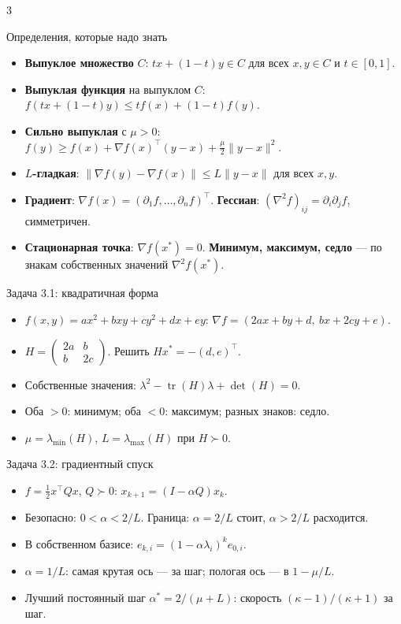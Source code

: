 \documentclass[10pt,a4paper]{article}
\makeatletter
\newcommand{\cssec}[1]{\par\addvspace{3.5pt}\noindent
  \colorbox{hselight}{\parbox{\dimexpr\linewidth-2\fboxsep}{\RaggedRight\hyphenpenalty=10000\color{hseblue}\bfseries\strut #1}}%
  \par\nobreak\vspace{1pt}\@afterheading}
\makeatother
\begin{document}
\fontsize{9}{10.6}\selectfont
\begin{multicols}{3}
\RaggedRight
\cssec{Определения, которые надо знать}
\begin{itemize}
  \item \textbf{Выпуклое множество} $C$: $tx+(1-t)y\in C$ для всех $x,y\in C$ и $t\in[0,1]$.
  \item \textbf{Выпуклая функция} на выпуклом $C$: $f(tx+(1-t)y)\le tf(x)+(1-t)f(y)$.
  \item \textbf{Сильно выпуклая} с $\mu>0$: $f(y)\ge f(x)+\nabla f(x)^\top(y-x)+\tfrac{\mu}{2}\|y-x\|^2$.
  \item \textbf{$L$-гладкая}: $\|\nabla f(y)-\nabla f(x)\|\le L\|y-x\|$ для всех $x,y$.
  \item \textbf{Градиент}: $\nabla f(x)=(\partial_1f,\dots,\partial_nf)^\top$. \textbf{Гессиан}: $(\nabla^2 f)_{ij}=\partial_i\partial_j f$, симметричен.
  \item \textbf{Стационарная точка}: $\nabla f(x^*)=0$. \textbf{Минимум, максимум, седло} — по знакам собственных значений $\nabla^2 f(x^*)$.
\end{itemize}

\cssec{Задача 3.1: квадратичная форма}
\begin{itemize}
  \item $f(x,y)=ax^2+bxy+cy^2+dx+ey$: $\nabla f=(2ax+by+d,\ bx+2cy+e)$.
  \item $H=\begin{pmatrix}2a&b\\b&2c\end{pmatrix}$. Решить $Hx^*=-(d,e)^\top$.
  \item Собственные значения: $\lambda^2-\operatorname{tr}(H)\lambda+\det(H)=0$.
  \item Оба $>0$: минимум; оба $<0$: максимум; разных знаков: седло.
  \item $\mu=\lambda_{\min}(H)$, $L=\lambda_{\max}(H)$ при $H\succ0$.
\end{itemize}

\cssec{Задача 3.2: градиентный спуск}
\begin{itemize}
  \item $f=\tfrac{1}{2}x^\top Qx$, $Q\succ0$: $x_{k+1}=(I-\alpha Q)x_k$.
  \item Безопасно: $0<\alpha<2/L$. Граница: $\alpha=2/L$ стоит, $\alpha>2/L$ расходится.
  \item В собственном базисе: $e_{k,i}=(1-\alpha\lambda_i)^k e_{0,i}$.
  \item $\alpha=1/L$: самая крутая ось — за шаг; пологая ось — в $1-\mu/L$.
  \item Лучший постоянный шаг $\alpha^*=2/(\mu+L)$: скорость $(\kappa-1)/(\kappa+1)$ за шаг.
\end{itemize}


\end{multicols}
\end{document}
